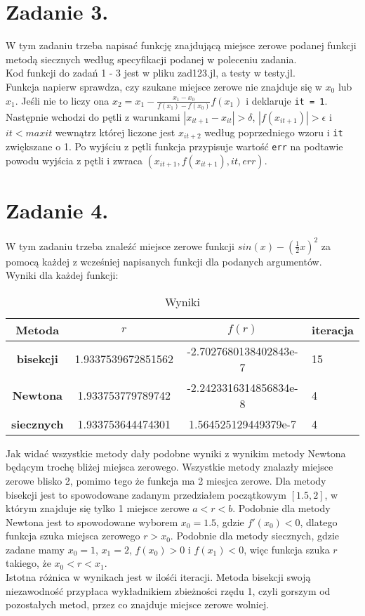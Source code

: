 \documentclass{article}
\begin{document}
\section{Zadanie 3.}
W tym zadaniu trzeba napisać funkcję znajdującą miejsce zerowe podanej funkcji metodą siecznych według specyfikacji podanej w poleceniu zadania.\\
Kod funkcji do zadań 1 - 3 jest w pliku zad123.jl, a testy w testy.jl.\\
Funkcja napierw sprawdza, czy szukane miejsce zerowe nie znajduje się w $x_{0}$ lub $x_{1}$. Jeśli nie to liczy ona $x_{2}=x_{1}-\frac{x_{1}-x_{0}}{f(x_{1})-f(x_{0})}f(x_{1})$ i deklaruje \verb|it = 1|. Następnie wchodzi do pętli z warunkami $|x_{it+1}-x_{it}|>\delta$, $|f(x_{it+1})|>\epsilon$ i $it < maxit$ wewnątrz której liczone jest $x_{it+2}$ według poprzedniego wzoru i \verb|it| zwiększane o 1. Po wyjściu z pętli funkcja przypisuje wartość \verb|err| na podtawie powodu wyjścia z pętli i zwraca $(x_{it+1}, f(x_{it+1}), it, err)$.
\section{Zadanie 4.}
W tym zadaniu trzeba znaleźć miejsce zerowe funkcji $sin(x)-(\frac{1}{2}x)^2$ za pomocą każdej z wcześniej napisanych funkcji dla podanych argumentów.\\
Wyniki dla każdej funkcji:
\begin{table}[h!]
  \begin{center}
    \caption{Wyniki}
    \label{tab:table1}
    \begin{tabular}{c|c|c|l}
      \textbf{Metoda} & \textbf{$r$} & \textbf{$f(r)$} & \textbf{iteracja}\\
      \hline
      \textbf{bisekcji} & 1.9337539672851562 & -2.7027680138402843e-7 & 15\\
      \textbf{Newtona} &  1.933753779789742 & -2.2423316314856834e-8 & 4\\
      \textbf{siecznych} & 1.933753644474301 & 1.564525129449379e-7 & 4\\
    \end{tabular}
  \end{center}
\end{table}
Jak widać wszystkie metody dały podobne wyniki z wynikim metody Newtona będącym trochę bliżej miejsca zerowego. Wszystkie metody znalazły miejsce zerowe blisko 2, pomimo tego że funkcja ma 2 miesjca zerowe. Dla metody bisekcji jest to spowodowane zadanym przedziałem początkowym $[1.5,2]$, w którym znajduje się tylko 1 miejsce zerowe $a<r<b$. Podobnie dla metody Newtona jest to spowodowane wyborem $x_{0}=1.5$, gdzie $f'(x_{0})<0$, dlatego funkcja szuka miejsca zerowego $r>x_{0}$. Podobnie dla metody siecznych, gdzie zadane mamy $x_{0}=1$, $x_{1}=2$, $f(x_{0})>0$ i $f(x_{1})<0$, więc funkcja szuka $r$ takiego, że $x_{0}<r<x_{1}$.\\
Istotna różnica w wynikach jest w ilośći iteracji. Metoda bisekcji swoją niezawodność przypłaca wykładnikiem zbieżności rzędu 1, czyli gorszym od pozostałych metod, przez co znajduje miejsce zerowe wolniej.
\end{document}

